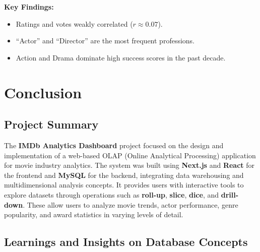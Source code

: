 \textbf{Key Findings:}
\begin{itemize}
	\item Ratings and votes weakly correlated ($r \approx 0.07$).
	\item ``Actor'' and ``Director'' are the most frequent professions.
	\item Action and Drama dominate high success scores in the past decade.
\end{itemize}

\section{Conclusion}

\subsection{Project Summary}
The \textbf{IMDb Analytics Dashboard} project focused on the design and implementation of a web-based OLAP (Online Analytical Processing) application for movie industry analytics. The system was built using \textbf{Next.js} and \textbf{React} for the frontend and \textbf{MySQL} for the backend, integrating data warehousing and multidimensional analysis concepts. It provides users with interactive tools to explore datasets through operations such as \textbf{roll-up}, \textbf{slice}, \textbf{dice}, and \textbf{drill-down}. These allow users to analyze movie trends, actor performance, genre popularity, and award statistics in varying levels of detail. 

\subsection{Learnings and Insights on Database Concepts}


